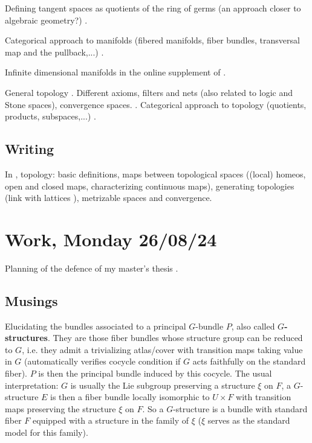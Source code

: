 \documentclass[a4paper,12pt,parskip=half*,chapterprefix=true,numbers=noendperiod]{scrreprt}
\theoremstyle{definition}
\theoremstyle{remark}
\begin{document}
Defining tangent spaces as quotients of the ring of germs (an approach closer to algebraic geometry?) \cite{Warner:DiffMan}.

Categorical approach to manifolds (fibered manifolds, fiber bundles, transversal map and the pullback,...) \cite{KMS:NatDiffGeo}.

Infinite dimensional manifolds in the online supplement of \cite{Lee:ManDiffGeo}.

General topology \cite{Munkres:Top}. Different axioms, filters and nets (also related to logic and Stone spaces), convergence spaces. \cite{Wiki:AxiomTop,Wiki:FiltersTop,Wiki:ConvergenceSpace}. Categorical approach to topology (quotients, products, subspaces,...) \cite{Lee:IntTopMan}.

\subsection{Writing}

In \cite{personal:BasicsDiffGeo}, topology: basic definitions, maps between topological spaces ((local) homeos, open and closed maps, characterizing continuous maps), generating topologies (link with lattices \cite{personal:Lattices}), metrizable spaces and convergence.

\section{Work, Monday 26/08/24}

Planning of the defence of my master's thesis \cite{personalHand:MasterThesis}.

\subsection{Musings}

Elucidating the bundles associated to a principal $G$-bundle $P$, also called \textbf{$G$-structures}. They are those fiber bundles whose structure group can be reduced to $G$, i.e. they admit a trivializing atlas/cover with transition maps taking value in $G$ (automatically verifies cocycle condition if $G$ acts faithfully on the standard fiber). $P$ is then the principal bundle induced by this cocycle. The usual interpretation: $G$ is usually the Lie subgroup preserving a structure $\xi$ on $F$, a $G$-structure $E$ is then a fiber bundle locally isomorphic to $U\times F$ with transition maps preserving the structure $\xi$ on $F$. So a $G$-structure is a bundle with standard fiber $F$ equipped with a structure in the family of $\xi$ ($\xi$ serves as the standard model for this family).
\end{document}
